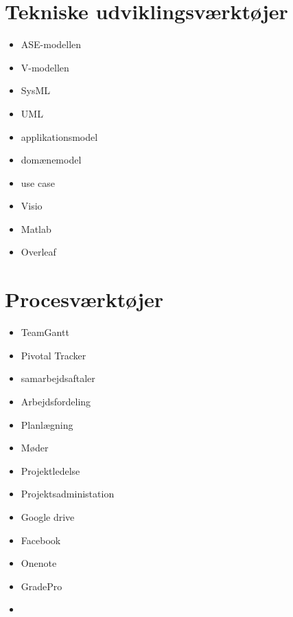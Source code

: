 \documentclass[main.tex]{subfiles}
\begin{document}
\section*{Tekniske udviklingsværktøjer}
\begin{itemize}
\item ASE-modellen
\item V-modellen
\item SysML
\item UML
\item applikationsmodel
\item domænemodel
\item use case
\item Visio
\item Matlab
\item Overleaf

\end{itemize}






\section*{Procesværktøjer}
\begin{itemize}
\item TeamGantt
\item Pivotal Tracker
\item samarbejdsaftaler
\item Arbejdsfordeling
\item Planlægning
\item Møder
\item Projektledelse
\item Projektsadministation
\item Google drive
\item Facebook
\item Onenote
\item GradePro
\item 

\end{itemize}
\end{document}
